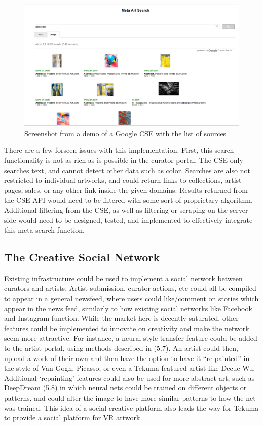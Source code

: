 \documentclass[fontsize=12pt]{scrartcl} %
\begin{document}
\begin{figure}
    \includegraphics[scale=0.3]{./img/meta.png}
    \caption{Screenshot from a demo of a Google CSE with the list of sources}
    \label{meta}
\end{figure}

There are a few forseen issues with this implementation. First, this search functionality is not as rich as is possible in the curator portal. The CSE only searches text, and cannot detect other data such as color. Searches are also not restricted to individual artworks, and could return links to collections, artist pages, sales, or any other link inside the given domains. Results returned from the CSE API would need to be filtered with some sort of proprietary algorithm. Additional filtering from the CSE, as well as filtering or scraping on the server-side would need to be designed, tested, and implemented to effectively integrate this meta-search function.

\subsection{The Creative Social Network}
Existing infrastructure could be used to implement a social network between curators and artists. Artist submission, curator actions, etc could all be compiled to appear in a general newsfeed, where users could like/comment on stories which appear in the news feed, similarly to how existing social networks like Facebook and Instagram function. While the market here is decently saturated, other features could be implemented to innovate on creativity and make the network seem more attractive. For instance, a neural style-transfer feature could be added to the artist portal, using methods described in (5.7).  An artist could then, upload a work of their own and then have the option to have it “re-painted” in the style of Van Gogh, Picasso, or even a Tekuma featured artist like Decue Wu.  Additional ‘repainting’ features could also be used for more abstract art, such as DeepDream (5.8)  in which neural nets could be trained on different objects or patterns, and could alter the image to have more similar patterns to how the net was trained. This idea of a social creative platform also leads the way for Tekuma to provide a social platform for VR artwork.
\end{document}
